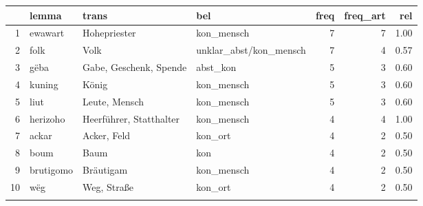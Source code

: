 \begin{tabular}{rlllrrr}
  \lsptoprule
 & lemma & trans & bel & freq & freq\_art & rel \\ 
  \midrule
1 & ewawart & Hohepriester & kon\_mensch &   7 &   7 & 1.00 \\ 
  2 & folk & Volk & unklar\_abst/kon\_mensch &   7 &   4 & 0.57 \\ 
  3 & gëba & Gabe, Geschenk, Spende & abst\_kon &   5 &   3 & 0.60 \\ 
  4 & kuning & König & kon\_mensch &   5 &   3 & 0.60 \\ 
  5 & liut & Leute, Mensch & kon\_mensch &   5 &   3 & 0.60 \\ 
  6 & herizoho & Heerführer, Statthalter & kon\_mensch &   4 &   4 & 1.00 \\ 
  7 & ackar & Acker, Feld & kon\_ort &   4 &   2 & 0.50 \\ 
  8 & boum & Baum & kon &   4 &   2 & 0.50 \\ 
  9 & brutigomo & Bräutigam & kon\_mensch &   4 &   2 & 0.50 \\ 
  10 & wëg & Weg, Straße & kon\_ort &   4 &   2 & 0.50 \\ 
   \lspbottomrule
\end{tabular}
